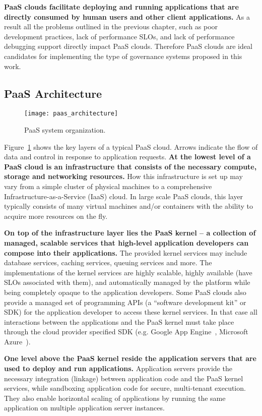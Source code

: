 \textbf{PaaS clouds facilitate deploying and running applications
that are directly consumed by human users and other client applications.} As a result all the problems 
outlined in the previous chapter, such as poor development practices, 
lack of performance SLOs, and lack of performance debugging support directly 
impact PaaS clouds. Therefore PaaS clouds are ideal candidates for implementing the type
of governance systems proposed in this work. 

\subsection{PaaS Architecture}

\begin{figure}
\centering
\texttt{[image: paas\_architecture]}
\caption{PaaS system organization.}
\label{fig:paas_architecture}
\end{figure}

Figure~\ref{fig:paas_architecture} shows the key layers of a typical PaaS cloud. Arrows indicate
the flow of data and control in response to application requests.
\textbf{At the lowest level of a PaaS cloud is an infrastructure that consists of the necessary compute, storage
and networking resources.} How this infrastructure is set up may vary from a simple cluster of physical 
machines to a comprehensive Infrastructure-as-a-Service (IaaS) cloud. In large scale PaaS clouds,
this layer typically consists of many virtual machines and/or containers with the ability to acquire more
resources on the fly.

\textbf{On top of the infrastructure layer lies the PaaS kernel -- a collection of managed, scalable
services that high-level application developers can compose into their applications.} The provided kernel services
may include database services, caching services, queuing services and more. 
The implementations of the kernel services are highly scalable, highly available (have SLOs associated with them),
and automatically managed by the platform while being completely opaque
to the application developers. Some PaaS clouds
also provide a managed set of programming APIs (a ``software development
kit'' or SDK) for the application developer to access these kernel services. 
In that case all interactions between the applications and the PaaS kernel must take place through
the cloud provider specified SDK (e.g. Google App Engine~\cite{gae}, Microsoft Azure~\cite{azure}). 

\textbf{One level above the PaaS kernel reside the application servers that are used to deploy and run
applications.} Application servers provide the necessary integration (linkage) between application code and the
PaaS kernel services, while sandboxing application code for secure, multi-tenant execution. They also
enable horizontal scaling of applications by running the same application on multiple application server
instances.

